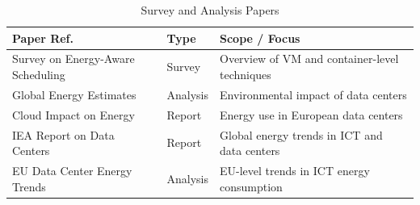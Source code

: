 \begin{table}[H]
\centering
\footnotesize
\begin{tabular}{|p{5.5cm}|p{3.5cm}|p{4cm}|}
\hline
\textbf{Paper Ref.} & \textbf{Type} & \textbf{Scope / Focus} \\
\hline
\cite{hameed_survey_2016} Survey on Energy-Aware Scheduling & Survey & Overview of VM and container-level techniques \\
\hline
\cite{masanet_2020} Global Energy Estimates & Analysis & Environmental impact of data centers \\
\hline
\cite{hintemann_2022} Cloud Impact on Energy & Report & Energy use in European data centers \\
\hline
\cite{IEADataCentres} IEA Report on Data Centers & Report & Global energy trends in ICT and data centers \\
\hline
\cite{avgerinou_trends_2017} EU Data Center Energy Trends & Analysis & EU-level trends in ICT energy consumption \\
\hline
\end{tabular}
\caption{Survey and Analysis Papers}
\label{tab:surveys}
\end{table}



